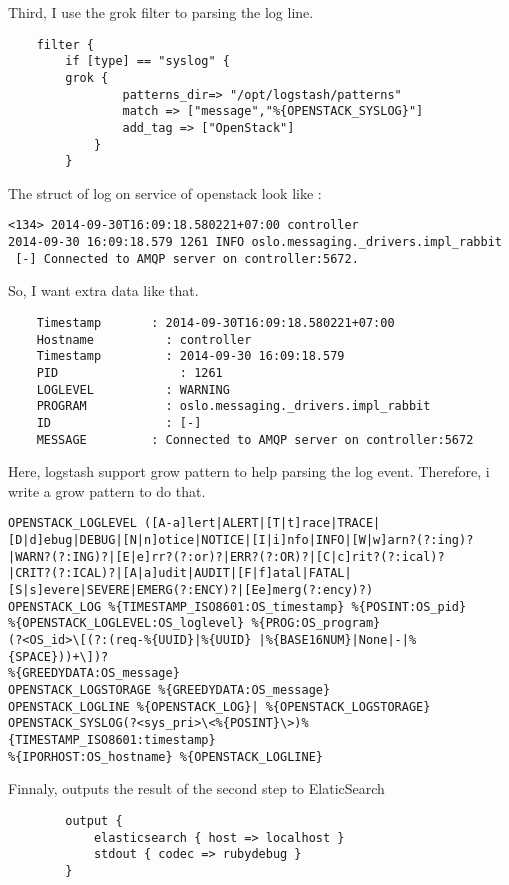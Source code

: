 Third, I use the grok filter to parsing the log line.
\begin{verbatim} 
	filter {
        if [type] == "syslog" {
        grok {
                patterns_dir=> "/opt/logstash/patterns"
                match => ["message","%{OPENSTACK_SYSLOG}"]
                add_tag => ["OpenStack"]
            }
        }
\end{verbatim}
The struct of log on service of openstack look like : 
\begin{verbatim}
<134> 2014-09-30T16:09:18.580221+07:00 controller 
2014-09-30 16:09:18.579 1261 INFO oslo.messaging._drivers.impl_rabbit
 [-] Connected to AMQP server on controller:5672. 
\end{verbatim}
So, I want extra data like that. 
\begin{verbatim}
	Timestamp 		: 2014-09-30T16:09:18.580221+07:00
	Hostname 		  : controller
	Timestamp		  : 2014-09-30 16:09:18.579
	PID 			    : 1261
	LOGLEVEL 		  : WARNING
	PROGRAM 		  : oslo.messaging._drivers.impl_rabbit
	ID 			      : [-]
	MESSAGE		    : Connected to AMQP server on controller:5672
\end{verbatim}
Here, logstash support grow pattern to help parsing the log event. Therefore, i write a grow pattern to do that.


\begin{verbatim}
OPENSTACK_LOGLEVEL ([A-a]lert|ALERT|[T|t]race|TRACE| 
[D|d]ebug|DEBUG|[N|n]otice|NOTICE|[I|i]nfo|INFO|[W|w]arn?(?:ing)?
|WARN?(?:ING)?|[E|e]rr?(?:or)?|ERR?(?:OR)?|[C|c]rit?(?:ical)?
|CRIT?(?:ICAL)?|[A|a]udit|AUDIT|[F|f]atal|FATAL|
[S|s]evere|SEVERE|EMERG(?:ENCY)?|[Ee]merg(?:ency)?)
OPENSTACK_LOG %{TIMESTAMP_ISO8601:OS_timestamp} %{POSINT:OS_pid} 
%{OPENSTACK_LOGLEVEL:OS_loglevel} %{PROG:OS_program} 
(?<OS_id>\[(?:(req-%{UUID}|%{UUID} |%{BASE16NUM}|None|-|%{SPACE}))+\])? 
%{GREEDYDATA:OS_message} 
OPENSTACK_LOGSTORAGE %{GREEDYDATA:OS_message}
OPENSTACK_LOGLINE %{OPENSTACK_LOG}| %{OPENSTACK_LOGSTORAGE}
OPENSTACK_SYSLOG(?<sys_pri>\<%{POSINT}\>)%{TIMESTAMP_ISO8601:timestamp} 
%{IPORHOST:OS_hostname} %{OPENSTACK_LOGLINE}
\end{verbatim}

Finnaly, outputs the result of the second step to ElaticSearch
\begin{verbatim}
		output {
			elasticsearch { host => localhost }
			stdout { codec => rubydebug }
		}
\end{verbatim}
